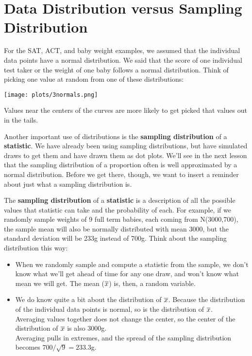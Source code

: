 \def\theTopic{Reading 18}


\section{ Data Distribution versus Sampling Distribution }



For the SAT,  ACT, and baby weight examples, we assumed that the
individual data points have a normal distribution.   We said that the
score of one individual test taker or the weight of one baby follows a
normal distribution.  Think of picking one value at random from one of
these distributions:




\texttt{[image: plots/3normals.png]}

Values near the centers of the curves are more likely to get picked
that values out in the tails. 



Another important use of distributions is the {\bf sampling
  distribution} of a {\bf statistic}.  We have already been using sampling
distributions, but have simulated draws to get them and have drawn
them as dot plots.  We'll see in the next lesson that the sampling
distribution of a proportion often is well approximated by a normal
distribution. Before we get there, though, we want to insert a
reminder about just what a sampling distribution is.

The {\bf sampling distribution} of a {\bf statistic} is a description
of all the possible values that statistic can take and the probability
of each.  For example, if we randomly sample weights of 9 full term
babies, each coming from N(3000,700), the sample mean will also be
normally distributed with mean 3000, but the standard deviation will
be 233g instead of 700g.  Think about the sampling distribution this
way: 
\begin{itemize}
\item When we randomly sample and compute a statistic from the sample,
  we don't know what we'll get ahead of time for any one draw, and
  won't know what mean we will get.  The mean ($\overline{x}$) is, then, a random
  variable.
\item We do know quite a bit about the distribution of $\overline{x}$. Because
  the distribution of the individual data points is normal, so is the
  distribution of $\overline{x}$. \\
  Averaging values together does not change the
  center, so the center of the distribution of $\overline{x}$ is also 3000g.  \\
  Averaging pulls in extremes, and the spread of the sampling
  distribution becomes $700/\sqrt{9} = 233.3$g.
\end{itemize}\vspace{1in}




